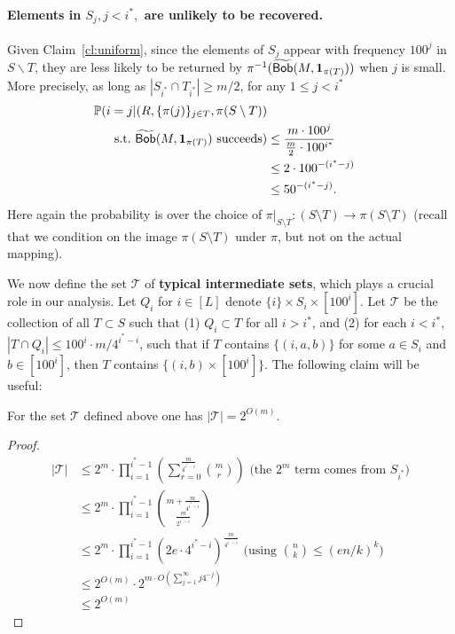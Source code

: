\paragraph{Elements in $S_{j}, j<i^*,$ are unlikely to be recovered.} Given Claim~\ref{cl:uniform}, since the elements of $S_j$ appear with frequency $100^j$ in $S\backslash T$, they are less likely to be returned by $\pi^{-1}(\widetilde{\mathsf{Bob}}(M, \mathbf{1}_{\pi(T)}))$ when $j$ is small.  More precisely, as long as $|S_{i^*}\cap T_{i^*}|\geq m/2$, for any $1\le j< i^*$
\begin{equation}
\begin{split}
\Pr(i = j | (R, \{\pi(j)\}_{j\in T}, \pi(S\setminus T)) \\ \text{~s.t.~}\widetilde{\query}(M, \mathbf{1}_{\pi(T)})\text{~succeeds})& \le \frac{m\cdot 100^j}{\frac m2\cdot 100^{i^*}}\\
& \le 2\cdot 100^{-(i^*-j)} \\
&\le 50^{-(i^*-j)} . \label{eqn:others-unlikely}
\end{split}
\end{equation}
Here again the probability is over the choice of $\pi|_{S\setminus T}:(S\setminus T)\to \pi(S\setminus T)$ (recall that we condition on the image $\pi(S\setminus T)$ under $\pi$, but not on the actual mapping).

We now define the set $\mathcal{T}$ of {\bf typical intermediate sets}, which plays a crucial role in our analysis.  Let $Q_i$ for $i\in [L]$ denote $\{i\} \times S_i \times [100^i]$. Let $\mathcal{T}$ be the collection of all $T\subset S$ such that (1) $Q_i\subset T$ for all $i>i^*$, and (2) for each $i < i^*$, $|T\cap Q_i| \le 100^i\cdot  m/4^{i^*-i}$, such that if $T$ contains $\{(i, a, b)\}$ for some $a\in S_i$ and $b\in [100^i]$, then $T$ contains $\{(i, b)\times [100^i]\}$.  The following claim will be useful:
\begin{claim}\label{cl:size-of-t}
For the set $\mathcal{T}$ defined above one has $|\mathcal{T}|=2^{O(m)}$.
\end{claim}
\begin{proof}
\begin{align*}
|\mathcal T| &\le 2^m \cdot \prod_{i=1}^{i^*-1}\left(\sum_{r=0}^{\frac m{4^{i^*-i}}} \binom mr\right)\text{ (the }2^m\text{ term comes from }S_{i^*}\text{)}\\
{}&\le 2^m \cdot \prod_{i=1}^{i^*-1} \binom{m + \frac m{4^{i^* - i}}}{\frac m{2^{i^* - i}}}\\
{}&\le 2^m \cdot \prod_{i=1}^{i^*-1} (2e\cdot 4^{i^*-i})^{\frac m{4^{i^* - i}}}\text{ (using }\binom nk \le (en/k)^k\textrm{)}\\
{}&\le 2^{O(m)} \cdot 2^{m\cdot O(\sum_{j=1}^\infty j 4^{-j})} \\
{}& \le 2^{O(m)}
\end{align*}
\end{proof}


